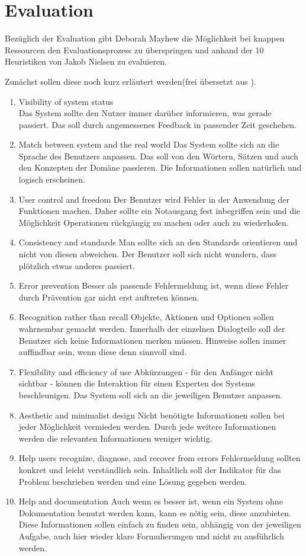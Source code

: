 \chapter{Evaluation}
Bezüglich der Evaluation gibt Deborah Mayhew die Möglichkeit bei knappen Ressourcen den Evaluationsprozess zu überspringen und anhand der 10 Heuristiken von Jakob Nielsen\cite{nielsen:usability} zu evaluieren. \cite[249]{Mayhew:UEL}

Zunächst sollen diese noch kurz erläutert werden(frei übersetzt aus \cite{nielsen:usability}).
\begin{enumerate}
\item	Visibility of system status\\
Das System sollte den Nutzer immer darüber informieren, was gerade passiert. Das soll durch angemessenes Feedback in passender Zeit geschehen.
\item Match between system and the real world
Das System sollte sich an die Sprache des Benutzers anpassen. Das soll von den Wörtern, Sätzen und auch den Konzepten der Domäne passieren. Die Informationen sollen natürlich und logisch erscheinen.
\item User control and freedom
Der Benutzer wird Fehler in der Anwendung der Funktionen machen. Daher sollte ein Notausgang fest inbegriffen sein und die Möglichkeit Operationen rückgängig zu machen oder auch zu wiederholen.
\item Consistency and standards
Man sollte sich an den Standards orientieren und nicht von diesen abweichen. Der Benutzer soll sich nicht wundern, dass plötzlich etwas anderes passiert.
\item Error prevention
Besser als passende Fehlermeldung ist, wenn diese Fehler durch Prävention gar nicht erst auftreten können.
\item Recognition rather than recall
Objekte, Aktionen und Optionen sollen wahrnembar gemacht werden. Innerhalb der einzelnen Dialogteile soll der Benutzer sich keine Informationen merken müssen. Hinweise sollen immer auffindbar sein, wenn diese denn sinnvoll sind. 
\item Flexibility and efficiency of use
Abkürzungen - für den Anfänger nicht sichtbar - können die Interaktion für einen Experten des Systems beschleunigen. Das System soll sich an die jeweiligen Benutzer anpassen. 
\item Aesthetic and minimalist design
Nicht benötigte Informationen sollen bei jeder Möglichkeit vermieden werden. Durch jede weitere Informationen werden die relevanten Informationen weniger wichtig. 
\item Help users recognize, diagnose, and recover from errors
Fehlermeldung sollten konkret und leicht verständlich sein. Inhaltlich soll der Indikator für das Problem beschrieben werden und eine Lösung gegeben werden.
\item Help and documentation
Auch wenn es besser ist, wenn ein System ohne Dokumentation benutzt werden kann, kann es nötig sein, diese anzubieten. Diese Informationen sollen einfach zu finden sein, abhängig von der jeweiligen Aufgabe, auch hier wieder klare Formulierungen und nicht zu ausführlich werden.
\end{enumerate}

